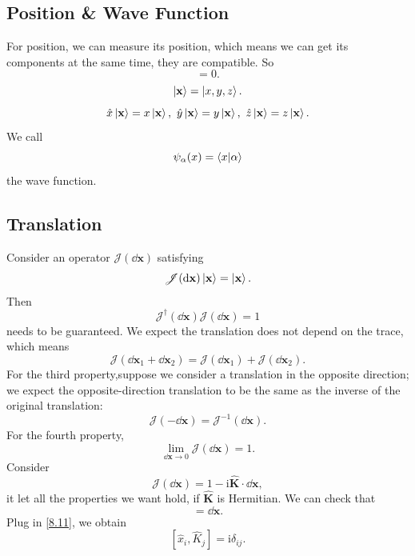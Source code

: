 \documentclass{article}
\theoremstyle{1}
\newcommand{\ii}{\mathrm{i}}
\begin{document}
\subsection{Position \& Wave Function}
For position, we can measure its position, which means we can get its components at the same time, they are compatible. So 
\begin{equation}
    [\hat{x}_i,\hat{x}_j]=0.
\end{equation}
\begin{equation}
    \ket{\mathbf{x}}=\ket{x,y,z}.
\end{equation}
\begin{equation}
    \hat{x}\ket{\mathbf{x}}=x\ket{\mathbf{x}},\ \hat{y}\ket{\mathbf{x}}=y\ket{\mathbf{x}},\ \hat{z}\ket{\mathbf{x}}=z\ket{\mathbf{x}}.
\end{equation}
We call 
\begin{equation}
    \psi_{\alpha}(x)=\braket{x}{\alpha}
\end{equation}
the wave function.
\subsection{Translation}
Consider an operator $\mathscr{J}(\dd{\mathbf{x}})$ satisfying
\begin{equation}
    \mathscr{J}(\dd{\mathbf{x}})\ket{\mathbf{x}}=\ket{\mathbf{x}}.
\end{equation}
Then 
\begin{equation}
    \mathscr{J}^\dagger(\dd{\mathbf{x}})\mathscr{J}(\dd{\mathbf{x}})=1
\end{equation}
needs to be guaranteed. We expect the translation does not depend on the trace, which means
\begin{equation}
    \mathscr{J}(\dd{\mathbf{x}}_1+\dd{\mathbf{x}}_2)=\mathscr{J}(\dd{\mathbf{x}}_1)+\mathscr{J}(\dd{\mathbf{x}}_2).
\end{equation}
For the third property,suppose we consider a translation in the opposite direction;
we expect the opposite-direction translation to be the same as the inverse of the
original translation:
\begin{equation}
    \mathscr{J}(-\dd{\mathbf{x}})=\mathscr{J}^{-1}(\dd{\mathbf{x}}).
\end{equation}
For the fourth property,
\begin{equation}
    \lim_{\dd{\mathbf{x}}\rightarrow0}\mathscr{J}(\dd{\mathbf{x}})=1.
\end{equation}
Consider
\begin{equation}\label{8.11}
    \mathscr{J}(\dd{\mathbf{x}})=1-\ii\hat{\mathbf{K}}\cdot\dd{\mathbf{x}},
\end{equation}
it let all the properties we want hold, if $\hat{\mathbf{K}}$ is Hermitian. We can check that 
\begin{equation}
    [\hat{\mathbf{x}},\mathscr{J}(\dd{\mathbf{x}})]=\dd{\mathbf{x}}.
\end{equation}
Plug in \eqref{8.11}, we obtain
\begin{equation}\label{8.13}
    [\hat{x}_i,\hat{K}_j]=\ii\delta_{ij}.
\end{equation}
\end{document}
